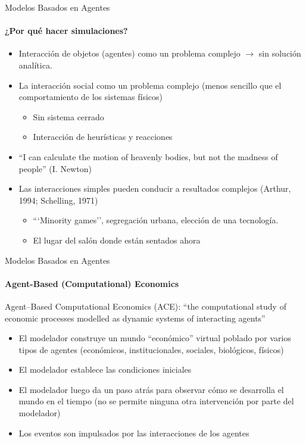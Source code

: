 \documentclass[11pt]{beamer}
\begin{document}
\begin{frame}
\begin{frame}{Modelos Basados en Agentes}
\framesubtitle{¿Por qué hacer simulaciones?}
\begin{itemize}
     \item Interacción de objetos (agentes) como un problema complejo $\rightarrow$ sin solución analítica.
\item La interacción social como un problema complejo (menos sencillo que el comportamiento de los sistemas físicos)
\begin{itemize}
     \item Sin sistema cerrado
\item Interacción de heurísticas y reacciones
\end{itemize}
\item “I can calculate the motion of heavenly bodies, but not the madness of people” (I. Newton)
\item Las interacciones simples pueden conducir a resultados complejos (Arthur, 1994; Schelling, 1971)
\begin{itemize}
\item ```Minority games'', segregación urbana, elección de una tecnología.
\item El lugar del salón donde están sentados ahora
\end{itemize}
 \end{itemize}   
\end{frame}

\begin{frame}{Modelos Basados en Agentes}
\framesubtitle{Agent-Based (Computational) Economics}
\begin{block}{}
 Agent–Based Computational Economics (ACE): “the computational study of
economic processes modelled as dynamic systems of interacting
agents” 
  \vskip5mm
  \hspace*{}
\end{block} 
\begin{itemize}
 \small   \item El modelador construye un mundo ``económico'' virtual poblado por varios tipos de agentes (económicos, institucionales, sociales, biológicos, físicos)
\item El modelador establece las condiciones iniciales
\item El modelador luego da un paso atrás para observar cómo se desarrolla el mundo en el tiempo (no se permite ninguna otra intervención por parte del modelador)
\item Los eventos son impulsados por las interacciones de los agentes
\end{itemize}
\end{frame}


\end{frame}
\end{document}
